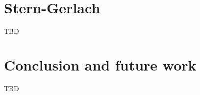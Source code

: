 \documentclass[12pt]{llncs}
\begin{document}
\lstset{language=[Objective]Caml,frame=shadowbox}




 
 

%  


 

    
% 

% 

% 


 



 

%

\section{Stern-Gerlach}
TBD

% 


%


% 


%
\section{Conclusion and future work}
TBD


% 


 


\newpage


   


%
\end{document}
